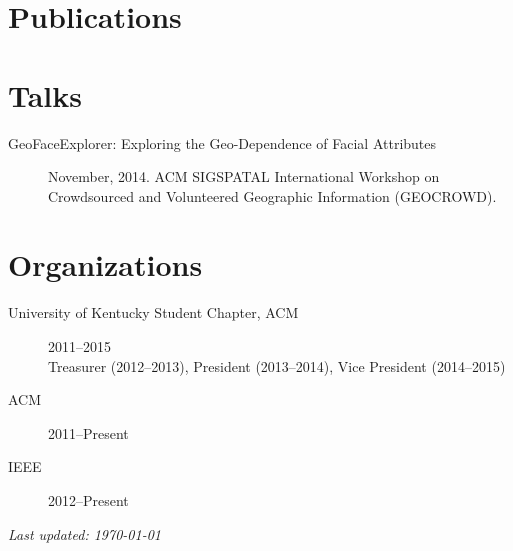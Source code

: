 \documentclass[12pt]{extarticle}
\begin{document}
\section*{Publications}

\nocite{*}
\printbibliography[heading=none]

\section*{Talks}

\begin{description} 
    \item[GeoFaceExplorer: Exploring the Geo-Dependence of Facial Attributes]
        November, 2014. 
        ACM SIGSPATAL International Workshop on Crowdsourced and Volunteered
        Geographic Information (GEOCROWD). 
\end{description}

\section*{Organizations}

\begin{description}
    \item[University of Kentucky Student Chapter, ACM] 
        2011--2015 \\
        Treasurer (2012--2013), President (2013--2014), Vice President
        (2014--2015)
    \item[ACM] 2011--Present
    \item[IEEE] 2012--Present
\end{description}

\vspace{\fill}
{\centering
    \small\emph{Last updated: \today}\par
}
\end{document}
